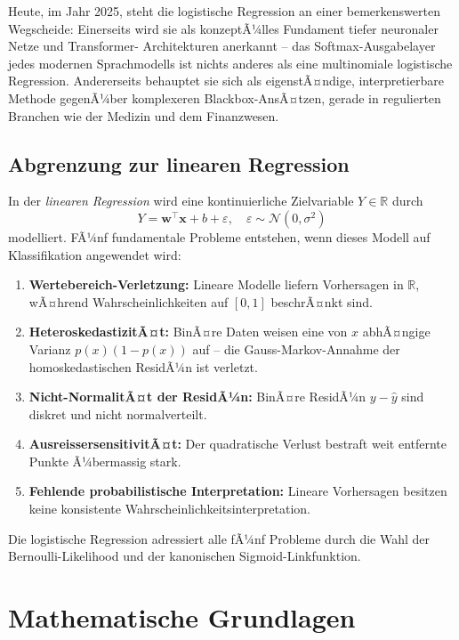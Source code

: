 ﻿\documentclass[12pt, a4paper]{article}
\theoremstyle{definition}
\theoremstyle{remark}
\newcommand{\R}{\mathbb{R}}
\newcommand{\vw}{\bm{w}}
\newcommand{\vx}{\bm{x}}
\newcommand{\T}{\top}
\begin{document}
Heute, im Jahr 2025, steht die logistische Regression an einer bemerkenswerten Wegscheide:
Einerseits wird sie als konzeptÃ¼lles Fundament tiefer neuronaler Netze und Transformer-
Architekturen anerkannt -- das Softmax-Ausgabelayer jedes modernen Sprachmodells ist nichts
anderes als eine multinomiale logistische Regression. Andererseits behauptet sie sich als
eigenstÃ¤ndige, interpretierbare Methode gegenÃ¼ber komplexeren Blackbox-AnsÃ¤tzen, gerade
in regulierten Branchen wie der Medizin und dem Finanzwesen.

\subsection{Abgrenzung zur linearen Regression}

In der \emph{linearen Regression} wird eine kontinuierliche Zielvariable $Y \in \R$ durch
\[
  Y = \vw^\T \vx + b + \varepsilon, \quad \varepsilon \sim \mathcal{N}(0, \sigma^2)
\]
modelliert. FÃ¼nf fundamentale Probleme entstehen, wenn dieses Modell auf Klassifikation angewendet wird:

\begin{enumerate}[label=(\roman*)]
  \item \textbf{Wertebereich-Verletzung:} Lineare Modelle liefern Vorhersagen in $\R$, wÃ¤hrend Wahrscheinlichkeiten auf $[0,1]$ beschrÃ¤nkt sind.
  \item \textbf{HeteroskedastizitÃ¤t:} BinÃ¤re Daten weisen eine von $x$ abhÃ¤ngige Varianz $p(x)(1-p(x))$ auf -- die Gauss-Markov-Annahme der homoskedastischen ResidÃ¼n ist verletzt.
  \item \textbf{Nicht-NormalitÃ¤t der ResidÃ¼n:} BinÃ¤re ResidÃ¼n $y - \hat{y}$ sind diskret und nicht normalverteilt.
  \item \textbf{AusreissersensitivitÃ¤t:} Der quadratische Verlust bestraft weit entfernte Punkte Ã¼bermassig stark.
  \item \textbf{Fehlende probabilistische Interpretation:} Lineare Vorhersagen besitzen keine konsistente Wahrscheinlichkeitsinterpretation.
\end{enumerate}

Die logistische Regression adressiert alle fÃ¼nf Probleme durch die Wahl der Bernoulli-Likelihood und der kanonischen Sigmoid-Linkfunktion.

\section{Mathematische Grundlagen}
\end{document}
